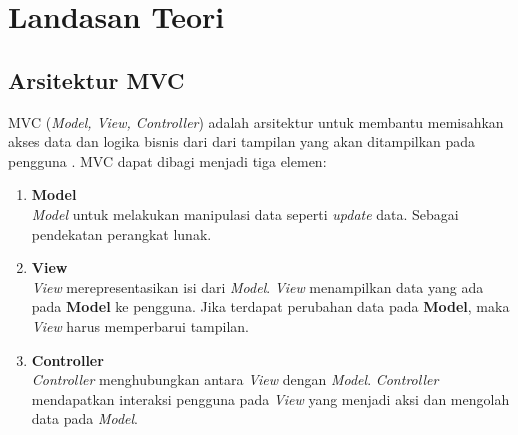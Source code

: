 \chapter{Landasan Teori}
\label{chap:LandasanTeori}

\section{Arsitektur MVC}
\label{sec:mvc}
MVC (\textit{Model, View, Controller}) adalah arsitektur untuk membantu memisahkan akses data dan logika bisnis dari dari tampilan yang akan ditampilkan pada pengguna \cite{mvc}. MVC dapat dibagi menjadi tiga elemen:
\begin{enumerate}
	\item \textbf{Model}\\
	\textit{Model} untuk melakukan manipulasi data seperti \textit{update} data. Sebagai pendekatan perangkat lunak.
	\item \textbf{View}\\
	\textit{View} merepresentasikan isi dari \textit{Model}. \textit{View} menampilkan data yang ada pada \textbf{Model} ke pengguna. Jika terdapat perubahan data pada \textbf{Model}, maka \textit{View} harus memperbarui tampilan. 
	\item \textbf{Controller}\\
	\textit{Controller} menghubungkan antara \textit{View} dengan \textit{Model}. \textit{Controller} mendapatkan interaksi pengguna pada \textit{View} yang menjadi aksi dan mengolah data pada \textit{Model}.
\end{enumerate}

